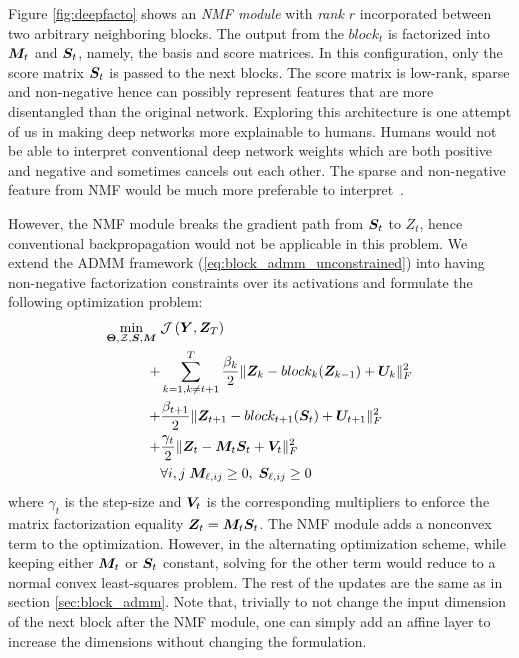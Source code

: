 Figure \ref{fig:deepfacto} shows an \emph{NMF module} with \emph{rank $r$} incorporated between two arbitrary neighboring blocks. The output from the $block_t$ is factorized into ${\bm{M}}_t$ and ${\bm{S}}_t$, namely, the basis and score matrices. In this configuration, only the score matrix ${\bm{S}}_t$ is passed to the next blocks. The score matrix is low-rank, sparse and non-negative hence can possibly represent features that are more disentangled than the original network. 
Exploring this architecture is one attempt of us in making deep networks more explainable to humans. Humans would not be able to interpret conventional deep network weights which are both positive and negative and sometimes cancels out each other. The sparse and non-negative feature from NMF would be much more preferable to interpret~\cite{collins2018deep}.

However, the NMF module breaks the gradient path from ${\bm{S}}_t$ to $Z_t$, hence conventional backpropagation would not be applicable in this problem. We extend the ADMM framework (\ref{eq:block_admm_unconstrained}) into having non-negative factorization constraints over its activations and formulate the following optimization problem:
\begin{eqnarray} \label{eq:block_admm_nmf}
	\min_{ {\bf \Theta}, \mathcal{Z}, {\bm{S}}, {\bm{M}}} \; &\mathcal{J}\left({\bm{Y}}, {\bm{Z}}_{T} \right) \nonumber \\
	+ & \sum_{k=1, k\neq t+1}^{T} \frac{\beta_k}{2} \| {\bm{Z}}_k - block_k({\bm{Z}}_{k-1}) + {\bm{U}}_k\|_F^2 \nonumber \\
	+ & \frac{\beta_{t+1}}{2} \| {\bm{Z}}_{t+1} - block_{t+1}({\bm{S}}_{t}) + {\bm{U}}_{t+1}\|_F^2 \nonumber \\
	+ &  {\frac{\gamma_t}{2} \| {\bm{Z}}_t - {\bm{M}}_t {\bm{S}}_t + {\bm{V}}_t\|_F^2} \nonumber \\
	  & {\forall i,j} \;  {\bm{M}}_{\ell,ij} \ge 0,\; {\bm{S}}_{\ell,ij} \ge 0 
\end{eqnarray}
where $\gamma_t$ is the step-size and ${\bm{V}}_t$ is the corresponding multipliers to enforce the matrix factorization equality ${\bm{Z}}_t = {\bm{M}}_t {\bm{S}}_t$. The NMF module adds a nonconvex term to the optimization. However, in the alternating optimization scheme, while keeping either ${\bm{M}}_t$ or ${\bm{S}}_t$ constant, solving for the other term would reduce to a normal convex least-squares problem. The rest of the updates are the same as in section \ref{sec:block_admm}. Note that, trivially to not change the input dimension of the next block after the NMF module, one can simply add an affine layer to increase the dimensions without changing the formulation.

